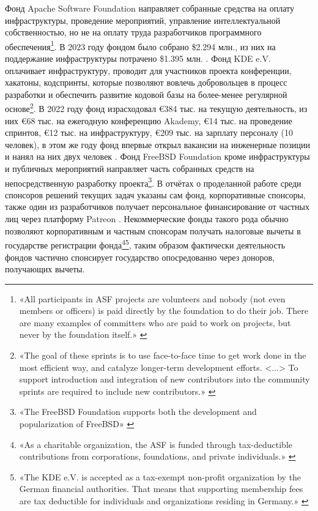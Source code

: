 \documentclass{article}
\begin{document}
Фонд Apache Software Foundation направляет собранные средства на оплату инфраструктуры, проведение мероприятий, управление интеллектуальной собственностью, но не на оплату труда разработчиков программного обеспечения\footnote{«All participants in ASF projects are volunteers and nobody (not even members or officers) is paid directly by the foundation to do their job. There are many examples of committers who are paid to work on projects, but never by the foundation itself.» \cite{apacheFunding}}. В 2023 году фондом было собрано \$2.294 млн., из них на поддержание инфраструктуры потрачено \$1.395 млн. \cite{apacheReport2023}. Фонд KDE e.V. оплачивает инфраструктуру, проводит для участников проекта конференции, хакатоны, кодспринты, которые позволяют вовлечь добровольцев в процесс разработки и обеспечить развитие кодовой базы на более-менее регулярной основе\footnote{«The goal of these sprints is to use face-to-face time to get work done in the most efficient way, and catalyze longer-term development efforts. <...> To support introduction and integration of new contributors into the community sprints are required to include new contributors.» \cite{kdeSprints}}. В 2022 году фонд израсходовал €384 тыс. на текущую деятельность, из них €68 тыс. на ежегодную конференцию Akademy, €14 тыс. на проведение спринтов, €12 тыс. на инфраструктуру, €209 тыс. на зарплату персоналу (10 человек), в этом же году фонд впервые открыл вакансии на инженерные позиции и нанял на них двух человек \cite{kdeeVReport2022}. Фонд FreeBSD Foundation кроме инфраструктуры и публичных мероприятий направляет часть собранных средств на непосредственную разработку проекта\footnote{«The FreeBSD Foundation supports both the development and popularization of FreeBSD» \cite{freeBsdAbout}}. В отчётах о проделанной работе среди спонсоров решений текущих задач указаны сам фонд, корпоративные спонсоры, также один из разработчиков получает персональное финансирование от частных лиц через платформу Patreon \cite{freeBsdStatus2023}. Некоммерческие фонды такого рода обычно позволяют корпоративным и частным спонсорам получать налоговые вычеты в государстве регистрации фонда\footnote{«As a charitable organization, the ASF is funded through tax-deductible contributions from corporations, foundations, and private individuals.» \cite{apacheHistory}}\footnote{«The KDE e.V. is accepted as a tax-exempt non-profit organization by the German financial authorities. That means that supporting membership fees are tax deductible for individuals and organizations residing in Germany.» \cite{kdeeVSupporting}}, таким образом фактически деятельность фондов частично спонсирует государство опосредованно через доноров, получающих вычеты.
\end{document}
